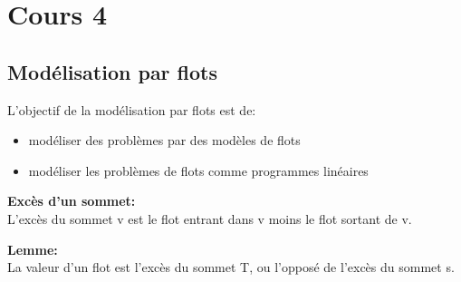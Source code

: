 \section{Cours 4}
\subsection{Modélisation par flots}
L'objectif de la modélisation par flots est de:
\begin{itemize}
	\item modéliser des problèmes par des modèles de flots
	\item modéliser les problèmes de flots comme programmes linéaires
\end{itemize}

\textbf{Excès d'un sommet:\\}
L'excès du sommet v est le flot entrant dans v moins le flot sortant de v.

\textbf{Lemme:\\}
La valeur d'un flot est l'excès du sommet T, ou l'opposé de l'excès du sommet s.
